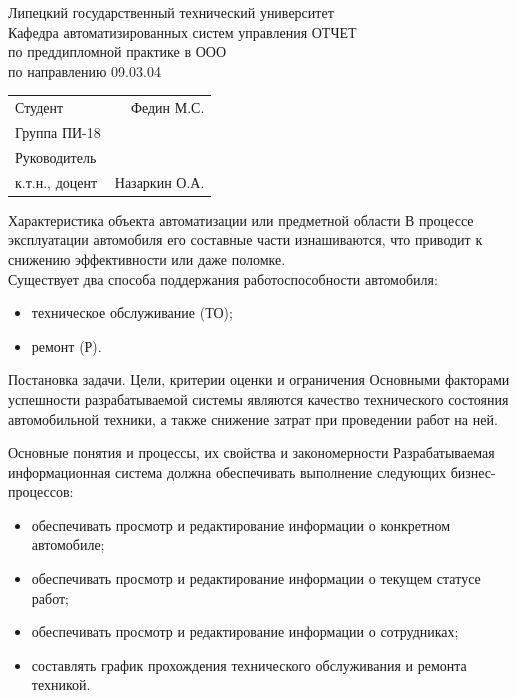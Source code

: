 \documentclass{beamer}
\begin{document}
\begin{frame}
    \begin{center}
        Липецкий государственный технический университет\\
        Кафедра автоматизированных систем управления
        \vfill
        ОТЧЕТ\\
        по преддипломной практике в ООО \\
        по направлению 09.03.04 \\
    \end{center}
    \vfill
    \begin{tabularx}{\textwidth}{LR}
        Студент & Федин М.С. \\
        Группа ПИ-18 & \\
        Руководитель & \\
        к.т.н., доцент & Назаркин О.А.
    \end{tabularx}
\end{frame}

\begin{frame}
    {Характеристика объекта автоматизации или предметной области}
    В процессе эксплуатации автомобиля его составные части изнашиваются, что
    приводит к снижению эффективности или даже поломке.
    \\[\baselineskip]

    Существует два способа поддержания работоспособности автомобиля:
    \begin{itemize}
        \item техническое обслуживание (ТО);
        \item ремонт (Р).
    \end{itemize}
\end{frame}

\begin{frame}
	{Постановка задачи. Цели, критерии оценки и ограничения}
    Основными факторами успешности разрабатываемой системы являются качество
    технического состояния автомобильной техники, а также снижение затрат при
    проведении работ на ней.
\end{frame}

\begin{frame}
	{Основные понятия и процессы, их свойства и закономерности}
    Разрабатываемая информационная система должна обеспечивать выполнение
    следующих бизнес-процессов:
    \begin{itemize}
      \item обеспечивать просмотр и редактирование информации о конкретном
        автомобиле;
      \item обеспечивать просмотр и редактирование информации о текущем статусе
        работ;
      \item обеспечивать просмотр и редактирование информации о сотрудниках;

      \item составлять график прохождения технического обслуживания и ремонта
        техникой.
    \end{itemize}
\end{frame}
\end{document}
